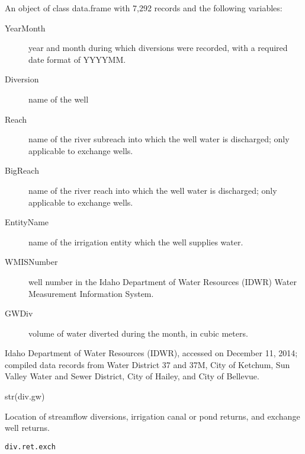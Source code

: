 \documentclass[a4paper]{book}
\begin{document}
\begin{Format}
An object of class data.frame with 7,292 records and the following variables:
\begin{description}

\item[YearMonth] year and month during which diversions were recorded,
with a required date format of YYYYMM.
\item[Diversion] name of the well
\item[Reach] name of the river subreach into which the well water is discharged;
only applicable to exchange wells.
\item[BigReach] name of the river reach into which the well water is discharged;
only applicable to exchange wells.
\item[EntityName] name of the irrigation entity which the well supplies water.
\item[WMISNumber] well number in the Idaho Department of Water Resources (IDWR)
Water Measurement Information System.
\item[GWDiv] volume of water diverted during the month, in cubic meters.

\end{description}
\end{Format}
%
\begin{Source}\relax
Idaho Department of Water Resources (IDWR), accessed on December 11, 2014;
compiled data records from Water District 37 and 37M, City of Ketchum,
Sun Valley Water and Sewer District, City of Hailey, and City of Bellevue.
\end{Source}
%
\begin{Examples}
\begin{ExampleCode}
str(div.gw)

\end{ExampleCode}
\end{Examples}
%
\begin{Description}\relax
Location of streamflow diversions, irrigation canal or pond returns, and
exchange well returns.
\end{Description}
%
\begin{Usage}
\begin{verbatim}
div.ret.exch
\end{verbatim}
\end{Usage}
%
\end{document}
